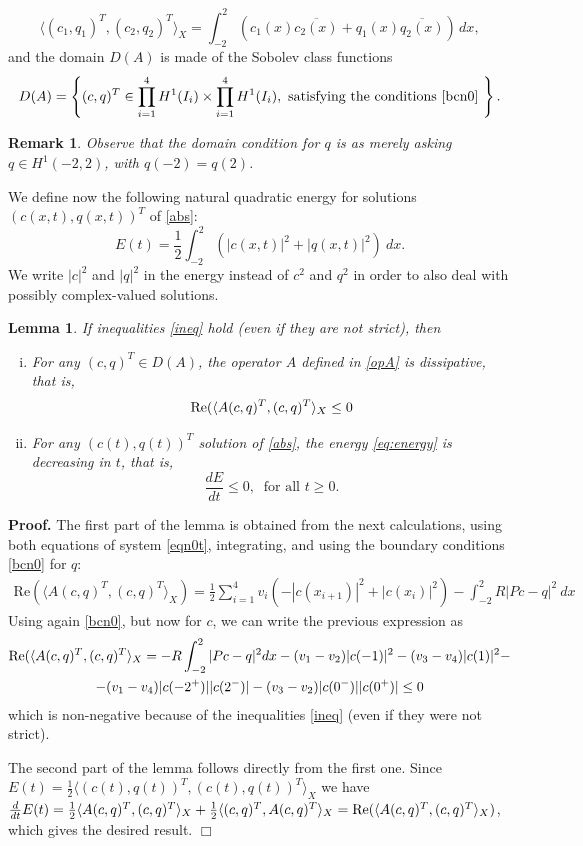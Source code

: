 \documentclass[a4paper]{article}
\newtheorem{lemma}[thm]{Lemma}
\newtheorem{rem}[thm]{Remark}
\def\Re{{\textrm{Re}}}
\numberwithin{equation}{section}
\newenvironment{pf}{\vspace{0.5em}\noindent\textbf{Proof.} }{\quad \hfill $\Box$ \\ \vspace{0.2em}\\}
\begin{document}
$$\langle (c_1,q_1)^T,(c_2,q_2)^T\rangle_X =\int_{-2}^2 \left(c_1(x)\overline{c_2(x)} +q_1(x)\overline{q_2(x)}\right)\, dx,$$
and
the domain $D(A)$ is made of the Sobolev class functions
\begin{equation*}%
D(A)=\left\{(c, q)^T \in \prod _{i=1}^4 H^1(I_i)\times\prod _{i=1}^4H^1(I_i), \text{ satisfying the conditions \eqref{bcn0} } \right\}.
\end{equation*}
\begin{rem}
Observe that the domain condition for $q$ is as merely asking $q\in H^1(-2,2)$, with $q(-2)=q(2)$.
\end{rem}
We define now the following natural quadratic energy for solutions $(c(x,t),q(x,t))^T$ of \eqref{abs}:
\begin{equation}\label{eq:energy}
E(t) =\dfrac{1}{2}\int_{-2}^{2} (|c(x,t)|^2+|q(x,t)|^2)\ dx.
\end{equation}
We write $|c|^2$ and $|q|^2$ in the energy instead of $c^2$ and $q^2$ in order to also deal with possibly complex-valued solutions.
\begin{lemma}\label{lem:dEdt}
If inequalities \eqref{ineq} hold (even if they are not strict), then
\begin{enumerate}[(i)]
\item
For any $(c,q)^T\in D(A)$, the operator $A$ defined in \eqref{opA} is dissipative, that is,
\begin{equation}\label{eq:maxmon}
{\rm Re}(\langle A(c,q)^T, (c,q)^T\rangle_X\le 0
\end{equation}
\item
For any $(c(t),q(t))^T$ solution of \eqref{abs}, the energy \eqref{eq:energy} is decreasing in $t$, that is,
$$\dfrac{dE}{dt} \leq 0,\ \textrm{ for all }t\ge 0.$$
\end{enumerate}
\end{lemma}
\begin{pf}
The first part of the lemma is obtained from the next calculations, using both equations of system \eqref{eqn0t}, integrating, and using the boundary conditions \eqref{bcn0} for $q$:
\begin{align*}
{\Re}\left(\langle A(c,q)^T,(c,q)^T\rangle_X\right)
=\frac{1}{2}\sum_{i=1}^4 v_i\left(-|c(x_{i+1})|^2+|c(x_i)|^2\right) -\int_{-2}^2 R|Pc-q|^2\ dx
\end{align*}
Using again \eqref{bcn0}, but now for $c$, we can write the previous expression as
\begin{multline}\label{dEdt}
{\rm Re}(\langle A(c,q)^T, (c,q)^T\rangle_X=
-R\int_{-2}^{2}|Pc-q|^2 dx
-(v_1-v_2)|c(-1)|^2-(v_3-v_4)|c(1)|^2-\\ -(v_1-v_4)|c(-2^+)||c(2^-)|-(v_3-v_2)|c(0^-)||c(0^+)|\le 0
\end{multline}
which is non-negative because of the inequalities \eqref{ineq} (even if they were not strict).

The second part of the lemma follows directly from the first one. Since $E(t)=\frac{1}{2}\langle (c(t),q(t))^T, (c(t),q(t))^T\rangle_X$ we have
$\frac{d}{dt}E(t)=\frac{1}{2}\langle A(c,q)^T, (c,q)^T\rangle_X+\frac{1}{2}\langle (c,q)^T, A(c,q)^T\rangle_X={\rm Re}(\langle A(c,q)^T, (c,q)^T\rangle_X)$, which gives the desired result.
\end{pf}
\end{document}
